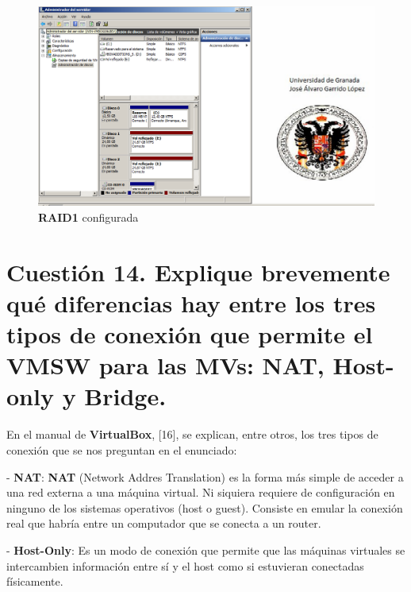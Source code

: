 \begin{figure}[H] %
\centering
\includegraphics[scale=0.5]{cuestion13-VolReflejados.PNG}  %
\caption{\textbf{RAID1} configurada} \label{fig:figura1}
\end{figure}



\section{Cuestión 14. Explique brevemente qué diferencias hay entre los tres tipos de conexión que permite el VMSW para las MVs: NAT, Host-only y Bridge.}

En el manual de \textbf{VirtualBox}, [16], se explican, entre otros, los tres tipos de conexión que se nos preguntan en el enunciado:

- \textbf{NAT}: \textbf{NAT} (Network Addres Translation) es la forma más simple de acceder a una red externa a una máquina virtual. Ni siquiera requiere de configuración en ninguno de los sistemas operativos (host o guest). Consiste en emular la conexión real que habría entre un computador que se conecta a un router.

- \textbf{Host-Only}: Es un modo de conexión que permite que las máquinas virtuales se intercambien información entre sí y el host como si estuvieran conectadas físicamente.

